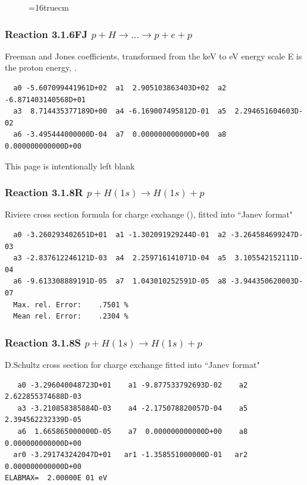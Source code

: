 \documentclass[12pt,dvips]{article}
\begin{document}
\begin{figure} \label{0.8}
\epsfxsize=16truecm
\end{figure}
\newpage



\subsubsection{
Reaction 3.1.6FJ
$ p + H \rightarrow . . . \rightarrow p + e + p $ }

Freeman and Jones coefficients, transformed from the keV to eV energy scale
E is the proton energy, \cite{kn:Freeman}.

\begin{small}\begin{verbatim}
  a0 -5.607099441961D+02  a1  2.905103863403D+02  a2 -6.871403140568D+01
  a3  8.714435377189D+00  a4 -6.169007495812D-01  a5  2.294651604603D-02
  a6 -3.495444000000D-04  a7  0.000000000000D+00  a8  0.000000000000D+00

\end{verbatim}\end{small}
\newpage
This page is intentionally left blank
\newpage

\subsubsection{
Reaction 3.1.8R $  p + H(1s) \rightarrow H(1s) + p  $
}
Riviere cross section formula for charge exchange
(\cite{kn:Riviere}), fitted into
``Janev format"

\begin{small}\begin{verbatim}
  a0 -3.260293402651D+01  a1 -1.302091929244D-01  a2 -3.264584699247D-03
  a3 -2.837612246121D-03  a4  2.259716141071D-04  a5  3.105542152111D-04
  a6 -9.613308889191D-05  a7  1.043010252591D-05  a8 -3.944350620003D-07
  Max. rel. Error:    .7501 %
  Mean rel. Error:    .2304 %
\end{verbatim}\end{small}

\subsubsection{
Reaction 3.1.8S $  p + H(1s) \rightarrow H(1s) + p  $
}

D.Schultz cross section for charge exchange
fitted into ``Janev format"


\begin{small}\begin{verbatim}
   a0 -3.296040048723D+01    a1 -9.877533792693D-02    a2  2.622855374688D-03
   a3 -3.210858385884D-03    a4 -2.175078820057D-04    a5  2.394562232339D-05
   a6  1.665865000000D-05    a7  0.000000000000D+00    a8  0.000000000000D+00
  ar0 -3.291743242047D+01   ar1 -1.358551000000D-01   ar2  0.000000000000D+00
ELABMAX=  2.00000E 01 eV
\end{verbatim}\end{small}
\end{document}
